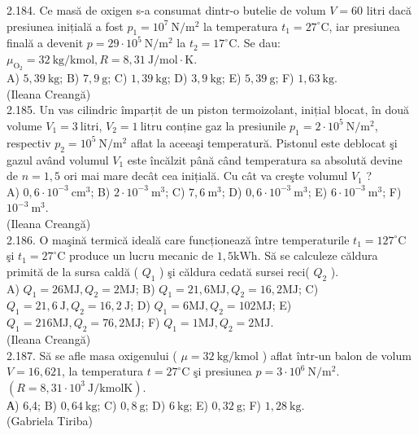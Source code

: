 \documentclass[10pt]{article}
\begin{document}
2.184. Ce masă de oxigen s-a consumat dintr-o butelie de volum $V=60$ litri dacă presiunea inițială a fost $p_{1}=10^{7} \mathrm{~N} / \mathrm{m}^{2}$ la temperatura $t_{1}=27^{\circ} \mathrm{C}$, iar presiunea finală a devenit $p=29 \cdot 10^{5} \mathrm{~N} / \mathrm{m}^{2}$ la $t_{2}=17^{\circ} \mathrm{C}$. Se dau: $\mu_{\mathrm{O}_{2}}=32 \mathrm{~kg} / \mathrm{kmol}, R=8,31 \mathrm{~J} / \mathrm{mol} \cdot \mathrm{K}$.\\ A) $5,39 \mathrm{~kg}$; B) $7,9 \mathrm{~g}$; C) $1,39 \mathrm{~kg}$; D) $3,9 \mathrm{~kg}$; E) $5,39 \mathrm{~g}$; F) $1,63 \mathrm{~kg}$.\\ (Ileana Creangă)\\

2.185. Un vas cilindric împarțit de un piston termoizolant, inițial blocat, în două volume $V_{1}=3 \mathrm{~litri}$, $V_{2}=1 \mathrm{~litru}$ conține gaz la presiunile $p_{1}=2 \cdot 10^{5} \mathrm{~N} / \mathrm{m}^{2}$, respectiv $p_{2}=10^{5} \mathrm{~N} / \mathrm{m}^{2}$ aflat la aceeaşi temperatură. Pistonul este deblocat şi gazul având volumul $V_{1}$ este încălzit până când temperatura sa absolută devine de $n=1,5$ ori mai mare decât cea inițială. Cu cât va creşte volumul $V_{1}$ ?\\ A) $0,6 \cdot 10^{-3} \mathrm{~cm}^{3}$; B) $2 \cdot 10^{-3} \mathrm{~m}^{3}$; C) $7,6 \mathrm{~m}^{3}$; D) $0,6 \cdot 10^{-3} \mathrm{~m}^{3}$; E) $6 \cdot 10^{-3} \mathrm{~m}^{3}$; F) $10^{-3} \mathrm{~m}^{3}$.\\ (Ileana Creangă)\\

2.186. O maşină termică ideală care funcționează între temperaturile $t_{1}=127^{\circ} \mathrm{C}$ şi $t_{1}=27^{\circ} \mathrm{C}$ produce un lucru mecanic de $1,5 \mathrm{kWh}$. Să se calculeze căldura primită de la sursa caldă ( $Q_{1}$ ) şi căldura cedată sursei reci( $Q_{2}$ ).\\ A) $Q_{1}=26 \mathrm{MJ}, Q_{2}=2 \mathrm{MJ}$; B) $Q_{1}=21,6 \mathrm{MJ}, Q_{2}=16,2 \mathrm{MJ}$; C) $Q_{1}=21,6 \mathrm{~J}, Q_{2}=16,2 \mathrm{~J}$; D) $Q_{1}=6 \mathrm{MJ}, Q_{2}=102 \mathrm{MJ}$; E) $Q_{1}=216 \mathrm{MJ}, Q_{2}=76,2 \mathrm{MJ}$; F) $Q_{1}=1 \mathrm{MJ}, Q_{2}=2 \mathrm{MJ}$.\\ (Ileana Creangă)\\

2.187. Să se afle masa oxigenului ( $\mu=32 \mathrm{~kg} / \mathrm{kmol}$ ) aflat într-un balon de volum $V=16,621$, la temperatura $t=27^{\circ} \mathrm{C}$ şi presiunea $p=3 \cdot 10^{6} \mathrm{~N} / \mathrm{m}^{2}$. $\left(R=8,31 \cdot 10^{3} \mathrm{~J} / \mathrm{kmolK}\right)$.\\ А) 6,4; B) $0,64 \mathrm{~kg}$; C) $0,8 \mathrm{~g}$; D) $6 \mathrm{~kg}$; E) $0,32 \mathrm{~g}$; F) $1,28 \mathrm{~kg}$.\\ (Gabriela Tiriba)\\
\end{document}
